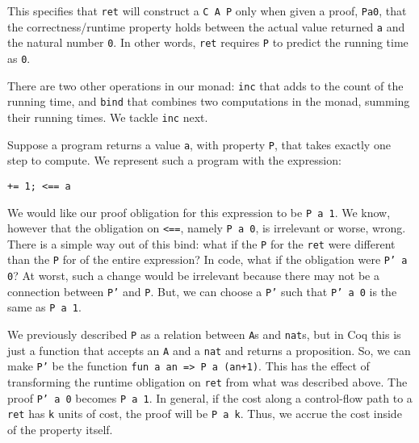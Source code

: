 \documentclass{llncs}
\newcommand{\Scribtexttt}[1]{{\texttt{#1}}}
\newcommand{\Stttextmore}{{\fontencoding{T1}\selectfont>}}
\newcommand{\Stttextless}{{\fontencoding{T1}\selectfont<}}
\newenvironment{SingleColumn}{\begin{list}{}{\topsep=0pt\partopsep=0pt%
\listparindent=0pt\itemindent=0pt\labelwidth=0pt\leftmargin=0pt\rightmargin=0pt%
\itemsep=0pt\parsep=0pt}\item}{\end{list}}
\newenvironment{InlineCode}{\begin{trivlist}\item\footnotesize}{\end{trivlist}}
\begin{document}
\noindent This specifies that \Scribtexttt{ret} will construct a \Scribtexttt{C A P} only when
given a proof, \Scribtexttt{Pa0}, that the correctness/runtime property holds
between the actual value returned \Scribtexttt{a} and the natural number
\Scribtexttt{0}. In other words, \Scribtexttt{ret} requires \Scribtexttt{P} to predict the
running time as \Scribtexttt{0}.

There are two other operations in our monad: \Scribtexttt{inc} that adds to the
count of the running time, and \Scribtexttt{bind} that combines two
computations in the monad, summing their running times. We tackle
\Scribtexttt{inc} next.

Suppose a program returns a value \Scribtexttt{a}, with property \Scribtexttt{P},
that takes exactly one step to compute. We represent such a program with the expression:


\noindent \begin{InlineCode}\begin{SingleColumn}\Scribtexttt{+= 1; {\Stttextless}== a}\end{SingleColumn}\end{InlineCode}

\noindent We would like our proof obligation for this expression to be \Scribtexttt{P a
1}.  We know, however that the obligation on \Scribtexttt{{\Stttextless}==}, namely \Scribtexttt{P a
0}, is irrelevant or worse, wrong. There is a simple way out of this
bind: what if the \Scribtexttt{P} for the \Scribtexttt{ret} were different than the
\Scribtexttt{P} for of the entire expression? In code, what if the obligation
were \Scribtexttt{P}\Scribtexttt{{'}}\Scribtexttt{ a 0}?  At worst, such a change would be irrelevant because
there may not be a connection between \Scribtexttt{P}\Scribtexttt{{'}}\Scribtexttt{} and \Scribtexttt{P}. But, we can
choose a \Scribtexttt{P}\Scribtexttt{{'}}\Scribtexttt{} such that \Scribtexttt{P}\Scribtexttt{{'}}\Scribtexttt{ a 0} is the same as \Scribtexttt{P a 1}.

We previously described \Scribtexttt{P} as a relation between \Scribtexttt{A}s and
\Scribtexttt{nat}s, but in Coq this is just a function that accepts an \Scribtexttt{A}
and a \Scribtexttt{nat} and returns a proposition. So, we can make \Scribtexttt{P}\Scribtexttt{{'}}\Scribtexttt{} be
the function \Scribtexttt{fun a an ={\Stttextmore} P a (an+1)}. This has the effect of
transforming the runtime obligation on \Scribtexttt{ret} from what was
described above. The proof \Scribtexttt{P}\Scribtexttt{{'}}\Scribtexttt{ a 0} becomes \Scribtexttt{P a 1}. In general,
if the cost along a control{-}flow path to a \Scribtexttt{ret} has \Scribtexttt{k} units
of cost, the proof will be \Scribtexttt{P a k}. Thus, we accrue the cost inside
of the property itself.
\end{document}
